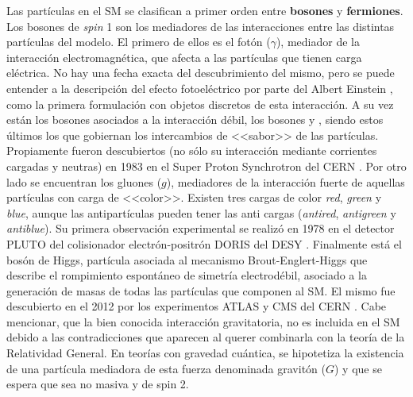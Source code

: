 Las partículas en el SM se clasifican a primer orden entre \textbf{bosones} y \textbf{fermiones}. Los bosones de \textit{spin} 1 son los mediadores de las interacciones entre las distintas partículas del modelo. El primero de ellos es el fotón ($\gamma$), mediador de la interacción electromagnética, que afecta a las partículas que tienen carga eléctrica. No hay una fecha exacta del descubrimiento del mismo, pero se puede entender a la descripción del efecto fotoeléctrico por parte del Albert Einstein \cite{einstein}, como la primera formulación con objetos discretos de esta interacción. A su vez están los bosones asociados a la interacción débil, los bosones \Zzero y \Wpm, siendo estos últimos los que gobiernan los intercambios de <<sabor>> de las partículas. Propiamente fueron descubiertos (no sólo su interacción mediante corrientes cargadas y neutras) en 1983 en el Super Proton Synchrotron del CERN \cite{DiLella:2015yit}. Por otro lado se encuentran los gluones ($g$), mediadores de la interacción fuerte de aquellas partículas con carga de <<color>>. Existen tres cargas de color \textit{red}, \textit{green} y \textit{blue}, aunque las antipartículas pueden tener las anti cargas (\textit{antired}, \textit{antigreen} y \textit{antiblue}). Su primera observación experimental se realizó en 1978 en el detector PLUTO del colisionador electrón-positrón DORIS del DESY \cite{gluon}. Finalmente está el bosón de Higgs, partícula asociada al mecanismo Brout-Englert-Higgs que describe el rompimiento espontáneo de simetría electrodébil, asociado a la generación de masas de todas las partículas que componen al SM. El mismo fue descubierto en el 2012 por los experimentos ATLAS y CMS del CERN \cite{higgs_atlas, higgs_cms}. Cabe mencionar, que la bien conocida interacción gravitatoria, no es incluida en el SM debido a las contradicciones que aparecen al querer combinarla con la teoría de la Relatividad General. En teorías con gravedad cuántica, se hipotetiza la existencia de una partícula mediadora de esta fuerza denominada gravitón ($G$) y que se espera que sea no masiva y de spin 2.

